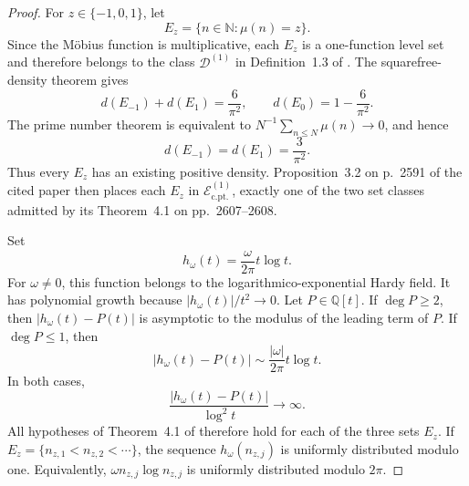 \documentclass[11pt]{amsart}
\numberwithin{equation}{section}\setcounter{tocdepth}{3}\setcounter{secnumdepth}{3}
\begin{document}
\begin{proof}
For $z\in\{-1,0,1\}$, let
\begin{equation}
 E_z=\{n\in\mathbb N:\mu(n)=z\}.
 \label{eq:mobius_level_sets}
\end{equation}
Since the Möbius function is multiplicative, each $E_z$ is a one-function level set and
therefore belongs to the class $\mathcal D^{(1)}$ in Definition~1.3 of
\cite{BergelsonKulagaPrzymusLemanczykRichter2019}.  The squarefree-density theorem gives
\begin{equation}
 d(E_{-1})+d(E_1)=\frac6{\pi^2},
 \qquad
 d(E_0)=1-\frac6{\pi^2}.
 \label{eq:mobius_level_density_sum}
\end{equation}
The prime number theorem is equivalent to
$N^{-1}\sum_{n\le N}\mu(n)\to0$, and hence
\begin{equation}
 d(E_{-1})=d(E_1)=\frac3{\pi^2}.
 \label{eq:mobius_signed_level_densities}
\end{equation}
Thus every $E_z$ has an existing positive density.  Proposition~3.2 on p.~2591 of the
cited paper then places each $E_z$ in $\mathcal E_{\mathrm{c.pt.}}^{(1)}$, exactly one
of the two set classes admitted by its Theorem~4.1 on pp.~2607--2608.

Set
\begin{equation}
 h_\omega(t)=\frac{\omega}{2\pi}t\log t.
 \label{eq:hardy_phase}
\end{equation}
For $\omega\ne0$, this function belongs to the logarithmico-exponential Hardy field.  It
has polynomial growth because $|h_\omega(t)|/t^2\to0$.  Let
$P\in\mathbb Q[t]$.  If $\deg P\ge2$, then
$|h_\omega(t)-P(t)|$ is asymptotic to the modulus of the leading term of $P$.  If
$\deg P\le1$, then
\begin{equation}
 |h_\omega(t)-P(t)|\sim\frac{|\omega|}{2\pi}t\log t.
 \label{eq:hardy_phase_linear_separation}
\end{equation}
In both cases,
\begin{equation}
 \frac{|h_\omega(t)-P(t)|}{\log^2t}\longrightarrow\infty.
 \label{eq:hardy_phase_boshernitzan_condition}
\end{equation}
All hypotheses of Theorem~4.1 of
\cite{BergelsonKulagaPrzymusLemanczykRichter2019} therefore hold for each of the three
sets $E_z$.  If $E_z=\{n_{z,1}<n_{z,2}<\cdots\}$, the sequence
$h_\omega(n_{z,j})$ is uniformly distributed modulo one.  Equivalently,
$\omega n_{z,j}\log n_{z,j}$ is uniformly distributed modulo $2\pi$.


\end{proof}
\end{document}
